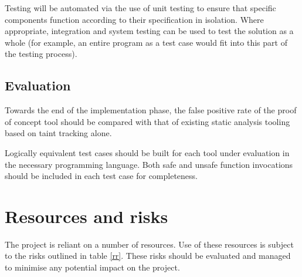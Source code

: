 \documentclass[a4paper]{article}
\begin{document}
    Testing will be automated via the use of unit testing to ensure that specific components function according to their specification in isolation. Where appropriate, integration and system testing can be used to test the solution as a whole (for example, an entire program as a test case would fit into this part of the testing process).
    
    \subsection*{Evaluation}
    
    Towards the end of the implementation phase, the false positive rate of the proof of concept tool should be compared with that of existing static analysis tooling based on taint tracking alone.
    
    Logically equivalent test cases should be built for each tool under evaluation in the necessary programming language. Both safe and unsafe function invocations should be included in each test case for completeness.
    
    \section*{Resources and risks}
    
    
    The project is reliant on a number of resources. Use of these resources is subject to the risks outlined in table \ref{rr}. These risks should be evaluated and managed to minimise any potential impact on the project.
    
\end{document}
